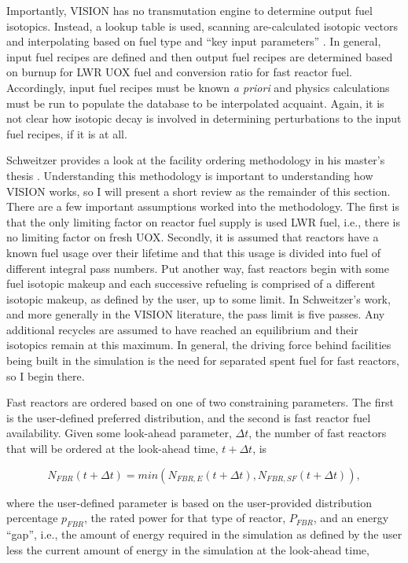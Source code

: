 Importantly, VISION has no transmutation engine to determine output fuel
isotopics. Instead, a lookup table is used, scanning are-calculated isotopic
vectors and interpolating based on fuel type and ``key input parameters''
\cite{jacobson_verifiable_2010}. In general, input fuel recipes are defined and
then output fuel recipes are determined based on burnup for LWR UOX fuel and
conversion ratio for fast reactor fuel. Accordingly, input fuel recipes must be
known \textit{a priori} and physics calculations must be run to populate the
database to be interpolated acquaint. Again, it is not clear how isotopic decay
is involved in determining perturbations to the input fuel recipes, if it is at
all.

Schweitzer provides a look at the facility ordering methodology in his master's
thesis \cite{schweitzer_improved_2008}. Understanding this methodology is
important to understanding how VISION works, so I will present a short review as
the remainder of this section. There are a few important assumptions worked into
the methodology. The first is that the only limiting factor on reactor fuel
supply is used LWR fuel, i.e., there is no limiting factor on fresh
UOX. Secondly, it is assumed that reactors have a known fuel usage over their
lifetime and that this usage is divided into fuel of different integral pass
numbers. Put another way, fast reactors begin with some fuel isotopic makeup and
each successive refueling is comprised of a different isotopic makeup, as
defined by the user, up to some limit. In Schweitzer's work, and more generally
in the VISION literature, the pass limit is five passes. Any additional recycles
are assumed to have reached an equilibrium and their isotopics remain at this
maximum. In general, the driving force behind facilities being built in the
simulation is the need for separated spent fuel for fast reactors, so I begin
there.

Fast reactors are ordered based on one of two constraining parameters. The first
is the user-defined preferred distribution, and the second is fast reactor fuel
availability. Given some look-ahead parameter, $\Delta t$, the number of fast
reactors that will be ordered at the look-ahead time, $t + \Delta t$, is

\begin{equation*}
N_{FBR}\left(t+\Delta t\right) = min \left( N_{FBR,E}\left(t+\Delta t\right),N_{FBR,SF}\left(t+\Delta t\right)\right),
\end{equation*}

where the user-defined parameter is based on the user-provided distribution
percentage $p_{FBR}$, the rated power for that type of reactor, $P_{FBR}$, and
an energy ``gap'', i.e., the amount of energy required in the simulation as
defined by the user less the current amount of energy in the simulation at the
look-ahead time,

